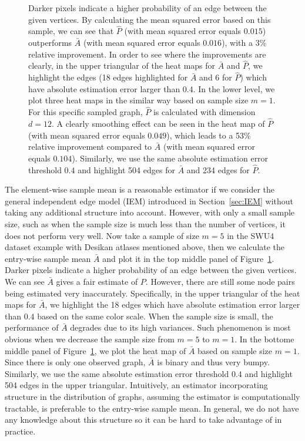 \begin{figure}
{Darker pixels indicate a higher probability of an edge between the given vertices.
By calculating the mean squared error based on this sample, we can see that $\hat{P}$ (with mean squared error equals $0.015$) outperforms $\bar{A}$ (with mean squared error equals $0.016$), with a 3\% relative improvement.
In order to see where the improvements are clearly, in the upper triangular of the heat maps for $\bar{A}$ and $\hat{P}$, we highlight the edges (18 edges highlighted for $\bar{A}$ and 6 for $\hat{P}$) which have absolute estimation error larger than $0.4$.
In the lower level, we plot three heat maps in the similar way based on sample size $m = 1$. For this specific sampled graph, $\hat{P}$ is calculated with dimension $d = 12$. A clearly smoothing effect can be seen in the heat map of $\hat{P}$ (with mean squared error equals $0.049$), which leads to a 53\% relative improvement compared to $\bar{A}$ (with mean squared error equals $0.104$). Similarly, we use the same absolute estimation error threshold $0.4$ and highlight 504 edges for $\bar{A}$ and 234 edges for $\hat{P}$.}
\label{fig:Matrix_desikan_m5}
\end{figure}



The element-wise sample mean is a reasonable estimator if we consider the general independent edge model (IEM) \citep{bollobas2007phase} introduced in Section~\ref{sec:IEM} without taking any additional structure into account. 
However, with only a small sample size, such as when the sample size is much less than the number of vertices, it does not perform very well.
Now take a sample of size $m=5$ in the SWU4 dataset example with Desikan atlases mentioned above, then we calculate the entry-wise sample mean $\bar{A}$ and plot it in the top middle panel of Figure~\ref{fig:Matrix_desikan_m5}. Darker pixels indicate a higher probability of an edge between the given vertices.
We can see $\bar{A}$ gives a fair estimate of $P$. However, there are still some node pairs being estimated very inaccurately. Specifically, in the upper triangular of the heat maps for $\bar{A}$, we highlight the 18 edges which have absolute estimation error larger than $0.4$ based on the same color scale.
When the sample size is small, the performance of $\bar{A}$ degrades due to its high variances. Such phenomenon is most obvious when we decrease the sample size from $m = 5$ to $m = 1$.
In the bottome middle panel of Figure~\ref{fig:Matrix_desikan_m5}, we plot the heat map of $\bar{A}$ based on sample size $m = 1$. Since there is only one observed graph, $\bar{A}$ is binary and thus very bumpy. Similarly, we use the same absolute estimation error threshold $0.4$ and highlight 504 edges in the upper triangular.
Intuitively, an estimator incorporating structure in the distribution of graphs, assuming the estimator is computationally tractable, is preferable to the entry-wise sample mean. 
In general, we do not have any knowledge about this structure so it can be hard to take advantage of in practice.



